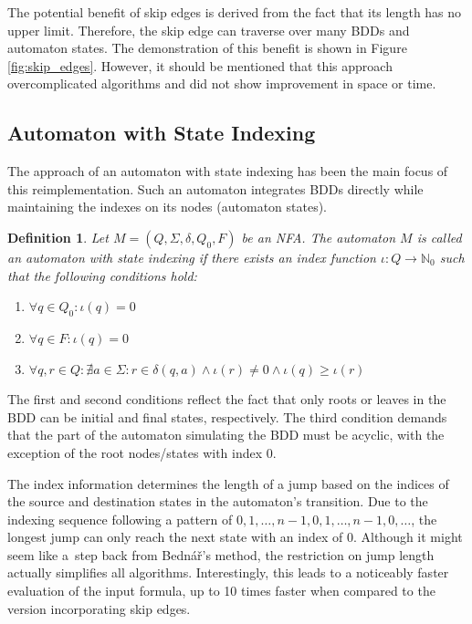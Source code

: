 \documentclass[pdflatex,sn-mathphys-num]{sn-jnl}%
\theoremstyle{thmstyleone}%
\theoremstyle{thmstyletwo}%
\theoremstyle{thmstylethree}%
\newtheorem{definition}{Definition}%
\begin{document}
        The potential benefit of skip edges is derived from the fact that its length has no upper limit. Therefore, the skip edge can traverse over many BDDs and automaton states. The demonstration of this benefit is shown in Figure \ref{fig:skip_edges}. However, it should be mentioned that this approach overcomplicated algorithms and did not show improvement in space or time.


    \subsection{Automaton with State Indexing}
        The approach of an automaton with state indexing has been the main focus of this reimplementation. Such an automaton integrates BDDs directly while maintaining the indexes on its nodes (automaton states).

        \vspace*{0.5em}

        \begin{definition}
            Let $M = (Q, \Sigma, \delta, Q_0, F)$ be an NFA. The automaton $M$ is called an automaton with state indexing if there exists an index function $\iota : Q \rightarrow \mathbb{N}_0$ such that the following conditions hold:
            \begin{enumerate}[noindent]
                \item $\forall q \in Q_0 : \iota(q) = 0$
                \item $\forall q \in F : \iota(q) = 0$
                \item $\forall q, r \in Q : \nexists a \in \Sigma : r \in \delta(q, a) \land \iota(r) \neq 0 \land \iota(q) \geq \iota(r)$
            \end{enumerate}
        \end{definition}

        The first and second conditions reflect the fact that only roots or leaves in the BDD can be initial and final states, respectively. The third condition demands that the part of the automaton simulating the BDD must be acyclic, with the exception of the root nodes/states with index 0.

        The index information determines the length of a jump based on the indices of the source and destination states in the automaton's transition. Due to the indexing sequence following a pattern of $0, 1, \dots, n-1, 0, 1, \dots, n-1, 0, \dots$, the longest jump can only reach the next state with an index of $0$. Although it might seem like a~step back from Bednář's method, the restriction on jump length actually simplifies all algorithms. Interestingly, this leads to a noticeably faster evaluation of the input formula, up to 10 times faster when compared to the version incorporating skip edges.
\end{document}
